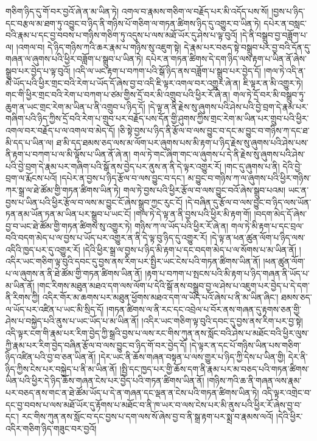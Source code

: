 གཅིག་ཉིད་དུ་གོ་བར་བྱའོ་ཞེ་ན་མ་ཡིན་ཏེ། འགལ་བ་རྣམས་གཅིག་ལ་བརྗོད་པར་མི་འདོད་པས་སོ། །བྱས་པ་ཉིད་དང་བརྩལ་མ་ཐག་ཏུ་འབྱུང་བ་ཉིད་ནི་གཉིས་པོ་གཅིག་ལ་གཏན་ཚིགས་ཉིད་དུ་འགྱུར་བ་ཡིན་ཏེ། དཔེར་ན་བསླང་བའི་རྣམ་པ་དང་བྱ་བབས་པ་གཉིས་གཅིག་ཏུ་འདུས་པ་ལས་མཐོ་ཡོར་དུ་ཤེས་པ་ལྟ་བུའོ། །དེ་ནི་བསྒྲུབ་བྱ་བཟློག་པ་ལ། །འགལ་བ། དེ་ཉིད་གཉིས་ཀའི་ཆར་རྣམ་པ་གཉིས་སུ་འཇུག་སྟེ། དེ་རྣམ་པར་བཅད་སྟེ་བསྒྲུབ་པར་བྱ་བའི་དོན་དུ་གཞན་ལ་ཞུགས་པའི་ཕྱིར་བཟློག་པ་སྒྲུབ་པ་ཡིན་ཏེ། དཔེར་ན་གཏན་ཚིགས་དེ་དག་ཉིད་ལས་རྟག་པ་ཡིན་ནོ་ཞེས་སྒྲུབ་པར་བྱེད་པ་ལྟ་བུའོ། །འདི་ལ་ཡང་རྟག་པ་བཀག་པའི་སྒོ་ཉིད་ནས་བཟློག་པ་སྒྲུབ་པར་བྱེད་དོ། །གལ་ཏེ་འདི་ན་མེ་ཡོད་པའི་ཕྱིར་གྲང་བའི་རེག་པ་ཡོད་དོ་ཞེས་བྱ་བ་འདི་ཇི་ལྟར་འགལ་བར་འགྱུར་ཞེ་ན། ཇི་ལྟར་ན་མི་འགྱུར་ཏེ། གང་གི་ཕྱིར་གྲང་བའི་རེག་པ་བཀག་པ་ཙམ་གྱིས་དྲོ་བར་མི་འགྲུབ་པའི་ཕྱིར་རོ་ཞེ་ན། གལ་ཏེ་དྲོ་བར་མི་བསྒྲུབ་ཏུ་ཆུག་ན་ཡང་གྲང་རེག་མ་ཡིན་པ་ནི་འགྲུབ་པ་ཉིད་དོ། །དེ་ལྟ་ན་ནི་རྗེས་སུ་ཞུགས་པའི་ཤེས་པའི་བྱེ་བྲག་དེ་རྣམ་པར་གཞིག་པའི་ཉིད་ཀྱིས་དྲོ་བའི་རེག་པ་གྲུབ་པར་བརྗོད་པས་དོན་གྱི་ཤུགས་ཀྱིས་གྲང་རེག་མ་ཡིན་པར་གྲུབ་པའི་ཕྱིར་འགལ་བར་བརྗོད་པ་ལ་འགལ་བ་མེད་དོ། །ཅི་སྟེ་བྱས་པ་ཉིད་ནི་རྩོལ་བ་ལས་བྱུང་བ་དང་མ་བྱུང་བ་གཉིས་ཀ་དང་ཐ་མི་དད་པ་ཡིན་ལ། ཐ་མི་དད་ཐམས་ཅད་ལས་མ་ལོག་པར་ཞུགས་པས་མི་རྟག་པ་ཉིད་རྗེས་སུ་ཞུགས་པའི་ཤེས་པས་ནི་རྟག་པ་བཀག་པ་ལ་མི་ལྟོས་པ་ཡིན་ནོ་ཞེ་ན། གལ་ཏེ་གང་ཞིག་གང་ལ་ཞུགས་པ་དེ་ནི་རྗེས་སུ་ཞུགས་པའི་ཤེས་པའི་བྱེ་བྲག་དེ་རྣམ་པར་གཞིག་པའི་སྒོ་ནས་བྱེད་པར་ནུས་ན་ནི་དེ་ལྟར་འགྱུར་རོ། །གང་དུ་ཞུགས་པ་ནི། དེའི་བྱེ་བྲག་ལ་རྨོངས་པའོ། །དཔེར་ན་བྱས་པ་ཉིད་རྩོལ་བ་ལས་བྱུང་བ་དང་། མ་བྱུང་བ་གཉིས་ཀ་ལ་ཞུགས་པའི་ཕྱིར་གཉིས་ཀར་སྒྲ་ལ་ཐེ་ཚོམ་གྱི་གཏན་ཚིགས་ཡིན་ཏེ། གལ་ཏེ་བྱས་པའི་ཕྱིར་རྩོལ་བ་ལས་བྱུང་བའོ་ཞེས་སྒྲུབ་པའམ། ཡང་ན་བྱས་པ་ཡིན་པའི་ཕྱིར་རྩོལ་བ་ལས་མ་བྱུང་ངོ་ཞེས་སྒྲུབ་ཀྱང་རུང་ངོ། །དེ་བཞིན་དུ་རྩོལ་བ་ལས་བྱུང་བ་ཉིད་ལས་ཡོན་ཏན་ནམ་ཡོན་ཏན་མ་ཡིན་པར་སྒྲུབ་པ་ཡང་ངོ། །གལ་ཏེ་དེ་ལྟ་ན་ནི་བྱས་པའི་ཕྱིར་མི་རྟག་གོ། །བདག་མེད་དོ་ཞེས་བྱ་བ་ཡང་ཐེ་ཚོམ་གྱི་གཏན་ཚིགས་སུ་འགྱུར་ཏེ། གཉིས་ཀ་ལ་ཡོད་པའི་ཕྱིར་རོ་ཞེ་ན། གལ་ཏེ་མི་རྟག་པ་དང་བྲལ་བའི་བདག་མེད་པ་ལ་བྱས་པ་ཡོད་པར་འགྱུར་ན་ནི་དེ་ལྟ་བུ་ཉིད་དུ་འགྱུར་རོ། །དེ་ལྟ་ན་ཕན་ཚུན་ལོག་པ་ཉིད་ལས་འདིའི་ཁྱད་པར་དུ་འགྱུར་རོ། །དེའི་ཕྱིར་སྒྲ་ལ་བྱས་པ་ཉིད་མི་རྟག་པ་དང་བདག་མེད་པ་ལ་སོགས་པ་མ་ཡིན་ནོ། །འདིར་ཡང་གཅིག་ལྟ་བུའི་དབང་དུ་བྱས་ནས་རིག་པར་སྤྱིར་ཡང་ངེས་པའི་གཏན་ཚིགས་ཡིན་ནོ། །ཕན་ཚུན་ལོག་པ་ལ་ཞུགས་ན་ནི་ཐེ་ཚོམ་གྱི་གཏན་ཚིགས་ཡིན་ནོ། །རྟག་པ་བཀག་པ་སྤངས་པའི་མི་རྟག་པ་ཉིད་གཞན་ནི་ཡོད་པ་མ་ཡིན་ནོ། །གང་རིགས་མཐུན་མཐའ་དག་ལས་ལོག་པ་དེའི་སྒོ་ནས་བསྒྲུབ་བྱ་ལ་ཤེས་པ་འཇུག་པར་བྱེད་པ་དེ་དག་ནི་རིགས་ཀྱི། འདིར་གོར་མ་ཆགས་པར་མཐུན་ཕྱོགས་མཐའ་དག་ལ་ཡོད་པའོ་ཞེས་པ་ནི་མ་ཡིན་ཞིང་། ཐམས་ཅད་ལ་ཡོད་པར་འཛིན་པ་ཡང་མི་སྲིད་དོ། །གཏན་ཚིགས་ལ་ནི་རང་དང་འབྲེལ་པ་བོར་ནས་གཞན་དུ་རྟགས་ཅན་གྱི་ཤེས་པ་བསྐྱེད་པའི་ནུས་པ་ཡང་ཡོད་པ་མ་ཡིན་ནོ། །འདིར་ཡང་གཅིག་ལྟ་བུའི་དབང་དུ་བྱས་ནས་རིག་པར་བྱ་སྟེ། འདི་ལྟར་ངག་གི་རྣམ་པར་རིག་བྱེད་ཀྱི་སྒྲའི་བྱས་པ་ལས་རང་གིས་ཀུན་ནས་སློང་བའི་ཤེས་པ་མཐོང་བའི་ཕྱིར་ལུས་ཀྱི་རྣམ་པར་རིག་བྱེད་བཞིན་རྩོལ་བ་ལས་བྱུང་བ་ཉིད་གོ་བར་བྱེད་དོ། །དེ་ལྟར་ན་དང་པོ་གཉིས་ཡིན་པས་གཅིག་ཉིད་འཛིན་པའི་བྱ་བ་ཅན་ཡིན་ནོ། །དེར་ཡང་ནི་ཆོས་གཞན་བསྟན་པ་ལས་གྱུར་པ་ཉིད་ཀྱི་དེས་པ་ཡིན་གྱི། དེར་ནི་ཉིད་ཀྱིས་ངེས་པར་བསྐྱེད་པ་ནི་མ་ཡིན་ནོ། །སྤྱི་དང་ཁྱད་པར་གྱི་ཆོས་དག་ནི་རྣམ་པར་མ་བཅད་པའི་གཏན་ཚིགས་ཡིན་པའི་ཕྱིར་དེ་ཉིད་ཆོས་གཞན་ངེས་པར་བྱེད་པའི་གཏན་ཚིགས་ཡིན་ནོ། །གཉིས་ཀའི་ཆ་ནི་གཞན་ལས་རྣམ་པར་བཅད་ནས་གང་ན་ཐེ་ཚོམ་ཡོད་པ་དེ་ན་གཞན་དང་ལྡན་ན་ངེས་པའི་གཏན་ཚིགས་ཡིན་ཏེ། འདི་ལྟར་འགྲེང་བ་དང་བྱ་བབས་པ་ལས་མཐོ་ཡོར་དུ་རྟོགས་པ་མཐོང་བ་ནི་ཁ་ཡར་བ་ལས་ངེས་པར་མི་ནུས་པའི་ཕྱིར་རོ་ཞེས་བྱ་བ་དང་། རང་གིས་ཀུན་ནས་སློང་བ་དང་བྱས་པ་དག་ལས་སོ་ཞེས་བྱ་བ་ནི་སྒྲ་རྟག་པར་སྨྲ་བ་རྣམས་ལའོ། །དེའི་ཕྱིར་འདིར་གཅིག་ཉིད་གཟུང་བར་བྱའོ། 